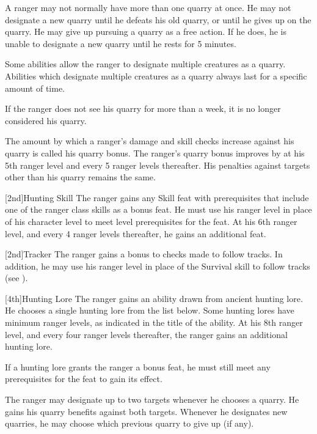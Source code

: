         A ranger may not normally have more than one quarry at once.
        He may not designate a new quarry until he defeats his old quarry, or until he gives up on the quarry.
        He may give up pursuing a quarry as a free action.
        If he does, he is unable to designate a new quarry until he rests for 5 minutes.

        Some abilities allow the ranger to designate multiple creatures as a quarry.
        Abilities which designate multiple creatures as a quarry always last for a specific amount of time.

        If the ranger does not see his quarry for more than a week, it is no longer considered his quarry.

        The amount by which a ranger's damage and skill checks increase against his quarry is called his quarry bonus.
        The ranger's quarry bonus improves by  at his 5th ranger level and every 5 ranger levels thereafter.
        His penalties against targets other than his quarry remains the same.

        [2nd]{Hunting Skill}
        The ranger gains any Skill feat with prerequisites that include one of the ranger class skills as a bonus feat.
        He must use his ranger level in place of his character level to meet level prerequisites for the feat.
        At his 6th ranger level, and every 4 ranger levels thereafter, he gains an additional feat.

        [2nd]{Tracker}
        The ranger gains a  bonus to checks made to follow tracks.
        In addition, he may use his ranger level in place of the Survival skill to follow tracks (see ).

        [4th]{Hunting Lore}
        The ranger gains an ability drawn from ancient hunting lore.
        He chooses a single hunting lore from the list below.
        Some hunting lores have minimum ranger levels, as indicated in the title of the ability.
        At his 8th ranger level, and every four ranger levels thereafter, the ranger gains an additional hunting lore.

        If a hunting lore grants the ranger a bonus feat, he must still meet any prerequisites for the feat to gain its effect.

        The ranger may designate up to two targets whenever he chooses a quarry.
        He gains his quarry benefits against both targets.
        Whenever he designates new quarries, he may choose which previous quarry to give up (if any).

